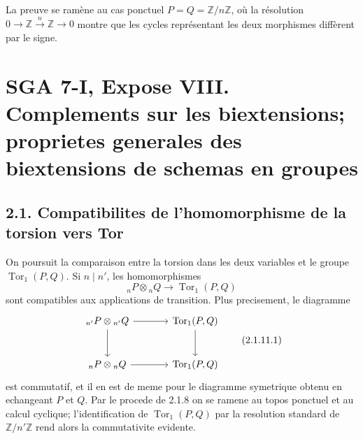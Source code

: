 \documentclass[11pt]{article}
\providecommand{\Spec}{\operatorname{Spec}}
\providecommand{\Pic}{\operatorname{Pic}}
\providecommand{\Tor}{\operatorname{Tor}}
\providecommand{\Ker}{\operatorname{Ker}}
\providecommand{\Z}{\mathbb Z}
\providecommand{\Q}{\mathbb Q}
\providecommand{\Ql}{\mathbb Q_\ell}
\providecommand{\Zl}{\mathbb Z_\ell}
\providecommand{\Gm}{\mathbb G_m}
\providecommand{\Hom}{\operatorname{Hom}}
\providecommand{\Ext}{\operatorname{Ext}}
\providecommand{\id}{\operatorname{id}}
\begin{document}
La preuve se ramène au cas ponctuel \(P=Q=\mathbb Z/n\mathbb Z\), où la résolution \(0\to\mathbb Z\xrightarrow{n}\mathbb Z\to0\) montre que les cycles représentant les deux morphismes diffèrent par le signe.



\providecommand{\Tate}{\mathrm T}
\providecommand{\Vtate}{\mathrm V}
\providecommand{\Biext}{\operatorname{Biext}}
\providecommand{\BIEXT}{\operatorname{BIEXT}}
\providecommand{\Ext}{\operatorname{Ext}}
\providecommand{\Tor}{\operatorname{Tor}}
\providecommand{\Hom}{\operatorname{Hom}}
\providecommand{\Coker}{\operatorname{Coker}}
\providecommand{\Spec}{\operatorname{Spec}}
\providecommand{\Pic}{\operatorname{Pic}}
\providecommand{\Ker}{\operatorname{Ker}}
\providecommand{\Gm}{\mathbb G_m}
\providecommand{\Ga}{\mathbb G_a}
\providecommand{\Z}{\mathbb Z}
\providecommand{\Q}{\mathbb Q}
\providecommand{\Ql}{\mathbb Q_\ell}
\providecommand{\Zl}{\mathbb Z_\ell}
\providecommand{\muN}{\boldsymbol\mu}
\providecommand{\nr}{\mathrm{nr}}
\providecommand{\ab}{\mathrm{ab}}
\providecommand{\tr}{\operatorname{tr}}
\providecommand{\id}{\mathrm{id}}


\section*{SGA 7-I, Expose VIII. Complements sur les biextensions; proprietes generales des biextensions de schemas en groupes}
\subsection*{2.1. Compatibilites de l'homomorphisme de la torsion vers Tor}

On poursuit la comparaison entre la torsion dans les deux variables et le groupe \(\Tor_1(P,Q)\).  Si \(n\mid n'\), les homomorphismes
\[
        {}_nP\otimes {}_nQ\longrightarrow \Tor_1(P,Q)
\]
sont compatibles aux applications de transition.  Plus precisement, le diagramme
\[
\begin{tikzcd}[column sep=large,row sep=large]
 {}_{n'}P\otimes {}_{n'}Q \arrow[r]\arrow[d] & \Tor_1(P,Q)\arrow[d]\\
 {}_{n}P\otimes {}_{n}Q \arrow[r] & \Tor_1(P,Q)
\end{tikzcd}
\qquad\text{(2.1.11.1)}
\]
est commutatif, et il en est de meme pour le diagramme symetrique obtenu en echangeant \(P\) et \(Q\).  Par le procede de 2.1.8 on se ramene au topos ponctuel et au calcul cyclique; l'identification de \(\Tor_1(P,Q)\) par la resolution standard de \(\Z/n'\Z\) rend alors la commutativite evidente.
\end{document}
